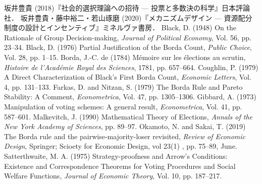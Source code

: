 \documentclass[dvipdfmx]{jsarticle}
\begin{document}
\newpage
\begin{thebibliography}{9}
  坂井豊貴 (2018)『社会的選択理論への招待 --- 投票と多数決の科学』日本評論社．
  坂井豊貴・藤中裕二・若山琢磨 (2020)『メカニズムデザイン --- 資源配分制度の設計とインセンティブ』ミネルヴァ書房．
  Black, D. (1948) On the Rationale of Group Decision-making, \textit{Journal of Political Economy},
  Vol. 56, pp. 23--34.
  Black, D. (1976) Partial Justification of the Borda Count, \textit{Public Choice},
  Vol. 28, pp. 1--15.
  Borda, J.-C. de (1784) M\'{e}moire sur les \'{e}lections au scrutin, \textit{Histoire de l'Acad\'{e}mie
  Royal des Sciences}, 1781, pp. 657--664.
  Coughlin, P. (1979) A Direct Characterization of Black's First Borda Count,
  \textit{Economic Letters}, Vol. 4, pp. 131--133.
  Farkas, D. and Nitzan, S. (1979) The Borda Rule and Pareto Stability: A Comment,
  \textit{Econometrica}, Vol. 47, pp. 1305--1306.
  Gibbard, A. (1973) Manipulation of voting schemes: A general result, \textit{Econometrica}, Vol. 41,
  pp. 587--601.
    Malkevitch, J. (1990) Mathematical Theory of Elections, \textit{Annals of the New York
    Academy of Sciences}, pp. 89--97.
  Okamoto, N. and Sakai, T. (2019) The Borda rule and the pairwise-majority-loser
  revisited, \textit{Review of Economic Design}, Springer; Scioety for Economic Design, vol 23(1)
  , pp. 75--89, June.
  Satterthwaite, M. A. (1975) Strategy-proofness and Arrow's Conditions:
  Existence and Correspondence Theorems for Voting Procedures and Social
  Welfare Functions, \textit{Journal of Economic Theory}, Vol. 10, pp. 187--217.
\end{thebibliography}
\end{document}
